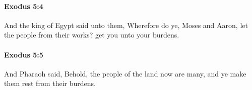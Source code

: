 		\paragraph{Exodus 5:4} %
			\label{EXODUS-5-4}

			And the king of Egypt said unto them, Wherefore do ye, Moses and Aaron, let the people from their works? get you unto your burdens.


		\paragraph{Exodus 5:5} %
			\label{EXODUS-5-5}

			And Pharaoh said, Behold, the people of the land now are many, and ye make them rest from their burdens.


